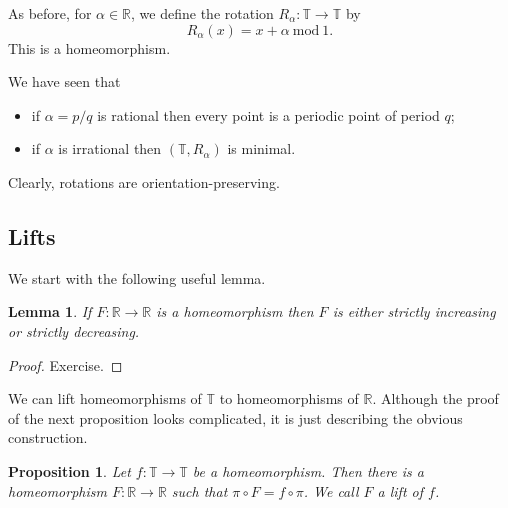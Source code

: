 \documentclass[12pt]{article}
\newtheorem{lemma}[theorem]{Lemma}
\newtheorem{proposition}[theorem]{Proposition}
\theoremstyle{definition}
\theoremstyle{remark}
\begin{document}
As before, for $\alpha \in \mathbb R$, we define the rotation 
$R_\alpha : \mathbb T \to \mathbb T$ by
\[
R_\alpha( x) = x+ \alpha \ \mathrm{mod} \ 1.
\] 
This is a homeomorphism.

We have seen that
\begin{itemize}
\item
if $\alpha = p/q$ is rational then every point is a periodic point of period $q$;
\item
if $\alpha$ is irrational then $(\mathbb T,R_\alpha)$ is minimal.
\end{itemize}

Clearly, rotations are orientation-preserving.

\subsection{Lifts}
We start with the following useful lemma.

\begin{lemma} \label{inc_or_dec}
If $F : \mathbb R \to \mathbb R$ is a homeomorphism then $F$ is either 
strictly increasing or strictly decreasing.
\end{lemma}

\begin{proof}
Exercise.
\end{proof}

We can lift homeomorphisms of $\mathbb T$ to homeomorphisms of $\mathbb R$.
Although the proof of the next proposition looks complicated, it is just describing the obvious construction.

\begin{proposition} \label{lifts_exist}
Let $f : \mathbb T \to \mathbb T$ be a homeomorphism. Then there is a homeomorphism 
$F : \mathbb R \to \mathbb R$ such that $\pi \circ F = f \circ \pi$.
We call $F$ a {\it lift} of $f$.
\end{proposition}
\end{document}
